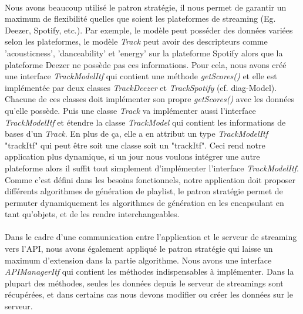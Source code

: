 \documentclass[12pt, openany]{report}
\begin{document}
\paragraph{}Nous avons beaucoup utilisé le patron stratégie, il nous permet de garantir un maximum de flexibilité quelles que soient les plateformes de streaming (Eg. Deezer, Spotify, etc.). Par exemple, le modèle peut posséder des données variées selon les plateformes, le modèle \textit{Track} peut avoir des descripteurs comme 'acousticness', 'danceability' et 'energy' sur la plateforme Spotify alors que la plateforme Deezer ne possède pas ces informations. Pour cela, nous avons créé une interface \textit{TrackModelItf} qui contient une méthode \textit{getScores()} et elle est implémentée par deux classes \textit{TrackDeezer} et \textit{TrackSpotify} (cf. diag-Model). Chacune de ces classes doit implémenter son propre \textit{getScores()} avec les données qu'elle possède. Puis une classe \textit{Track} va implémenter aussi l'interface \textit{TrackModelItf} et étendre la classe \textit{TrackModel} qui contient les informations de bases d'un \textit{Track}. En plus de ça, elle a en attribut un type \textit{TrackModelItf} "trackItf" qui peut être soit une classe soit un "trackItf". Ceci rend notre application plus dynamique, si un jour nous voulons intégrer une autre plateforme alors il suffit tout simplement d'implémenter l'interface \textit{TrackModelItf}. Comme c'est défini dans les besoins fonctionnels, notre application doit proposer différents algorithmes de génération de playlist, le patron stratégie permet de permuter dynamiquement les algorithmes de génération en les encapsulant en tant qu'objets, et de les rendre interchangeables. 

\paragraph{}Dans le cadre d'une communication entre l'application et le serveur de streaming vers l'API, nous avons également appliqué le patron stratégie qui laisse un maximum d'extension dans la partie algorithme. Nous avons une interface \textit{APIManagerItf} qui contient les méthodes indispensables à implémenter. Dans la plupart des méthodes, seules les données depuis le serveur de streamings sont récupérées, et dans certains cas nous devons modifier ou créer les données sur le serveur.
\end{document}
